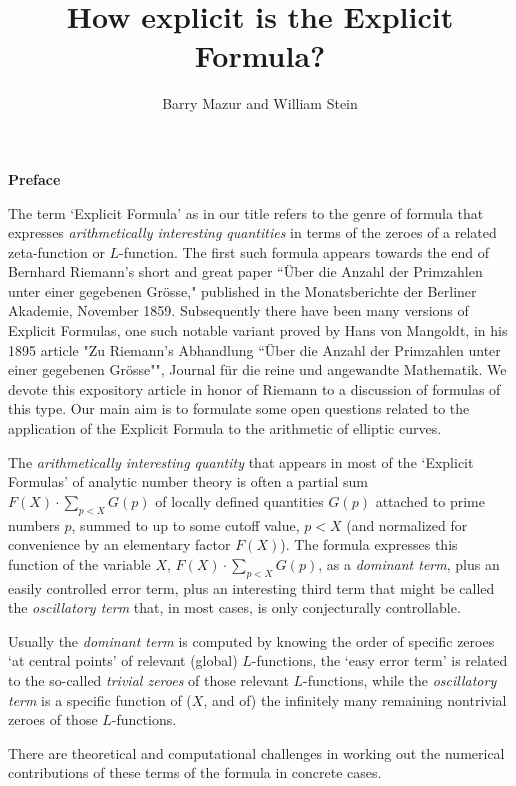 \documentclass[11pt]{article}
\title{How explicit is the Explicit Formula?}
\author{Barry Mazur and William Stein}
\theoremstyle{plain}
\theoremstyle{definition}
\numberwithin{equation}{section}
\numberwithin{figure}{section}
\numberwithin{table}{section}
\begin{document}
\maketitle


\vskip10pt
\centerline{\bf Preface}
\vskip10pt

The  term `Explicit Formula' as in our title refers to the genre of formula that expresses {\it arithmetically interesting quantities} in terms of the zeroes of  a related zeta-function or $L$-function.  The first such formula appears towards the end of Bernhard Riemann's short and great paper  ``\"{U}ber die Anzahl der Primzahlen unter einer
gegebenen Gr\"{o}sse," published in the
Monatsberichte der Berliner Akademie,
November 1859.  Subsequently there have been many versions of Explicit Formulas, one such notable variant  proved by Hans von  Mangoldt, in his 1895 article  "Zu Riemann's Abhandlung ``\"{U}ber die Anzahl der Primzahlen unter einer gegebenen Gr\"{o}sse"", Journal f\"{u}r die reine und angewandte Mathematik.  We devote this expository  article in honor of Riemann to a discussion of formulas of this type. Our main aim is to formulate some open questions related to the application of the Explicit Formula to the arithmetic of elliptic curves.

  The {\it arithmetically interesting quantity} that appears in most of the `Explicit Formulas' of analytic number theory is often  a partial sum $F(X)\cdot\sum_{p<X}G(p)$ of locally defined quantities $G(p)$ attached to prime numbers $p$, summed to up to some cutoff value, $p<X$  (and normalized for convenience by an elementary factor $F(X)$). The formula expresses this function of the variable $X$, $F(X)\cdot\sum_{p<X}G(p)$, as a {\it dominant term}, plus an easily controlled error term, plus an interesting third term that might be called the {\it oscillatory term} that, in most cases, is only conjecturally controllable.

  Usually the {\it dominant term} is computed by knowing the order of specific zeroes `at central points' of relevant (global) $L$-functions, the `easy error term' is related to the so-called {\it trivial zeroes} of those relevant $L$-functions, while the {\it oscillatory term} is  a specific function of ($X$, and of) the infinitely many remaining nontrivial zeroes of those $L$-functions.


 There are theoretical and computational challenges in working out the  numerical contributions of these terms of the formula in concrete cases.
\end{document}
